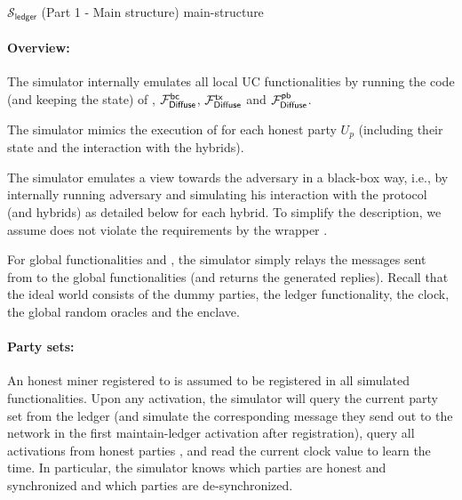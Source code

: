 \begin{simulatorbox}
    {$\mathcal{S}_{\mathsf{ledger}}$ (Part 1 - Main structure)}
    {main-structure}

    \paragraph{Overview:}
    \begin{cccItemize}[nosep]
        \item The simulator internally emulates all local UC functionalities by running the code (and keeping the state) of \funcGRO, $\mathcal{F}_{\mathsf{Diffuse}}^{\mathsf{bc}}$, $\mathcal{F}_{\mathsf{Diffuse}}^{\mathsf{tx}}$ and $\mathcal{F}_{\mathsf{Diffuse}}^{\mathsf{pb}}$.

        \item The simulator mimics the execution of \protocFairLedger for each honest party $U_p$ (including their state and the interaction with the hybrids).

        \item The simulator emulates a view towards the adversary \adv in a black-box way, i.e., by internally running adversary \adv and simulating his interaction with the protocol (and hybrids) as detailed below for each hybrid.
        To simplify the description, we assume \adv does not violate the requirements by the wrapper \wrapper{\funcGRO}.

        \item For global functionalities \funcGRO and \funcEnclave, the simulator simply relays the messages sent from \adv to the
        global functionalities (and returns the generated replies).
        Recall that the ideal world consists of the dummy parties, the ledger functionality, the clock, the global random oracles and the enclave.
    \end{cccItemize}

    \paragraph{Party sets:}
    An honest miner \party registered to \funcFairLedger is assumed to be registered in all simulated functionalities.
    Upon any activation, the simulator will query the current party set from the ledger (and simulate the corresponding message they send out to the network in the first maintain-ledger activation after registration), query all activations from honest parties \honestInputSeq, and read the current clock value to learn the time.
    In particular, the simulator knows which parties are honest and synchronized and which parties are de-synchronized.


\end{simulatorbox}
